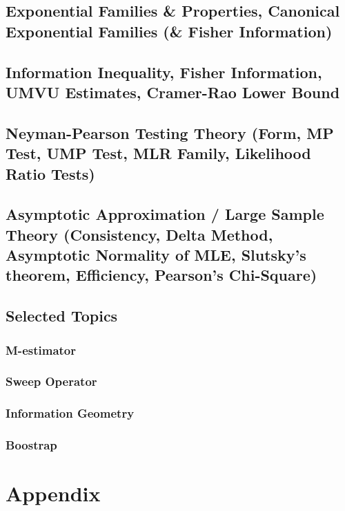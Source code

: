 \documentclass{memoir}
\begin{document}
\chapter{Exponential Families \& Properties, Canonical Exponential Families (\& Fisher Information)}
\chapter{Information Inequality, Fisher Information, UMVU Estimates, Cramer-Rao Lower Bound}
\chapter{Neyman-Pearson Testing Theory (Form, MP Test, UMP Test, MLR Family, Likelihood Ratio Tests)}
\chapter{Asymptotic Approximation / Large Sample Theory (Consistency, Delta Method, Asymptotic Normality of MLE, Slutsky's theorem, Efficiency, Pearson's Chi-Square)}

\chapter{Selected Topics}
\section{M-estimator}
\section{Sweep Operator}
\section{Information Geometry}
\section{Boostrap}

\part{Appendix}
\end{document}
